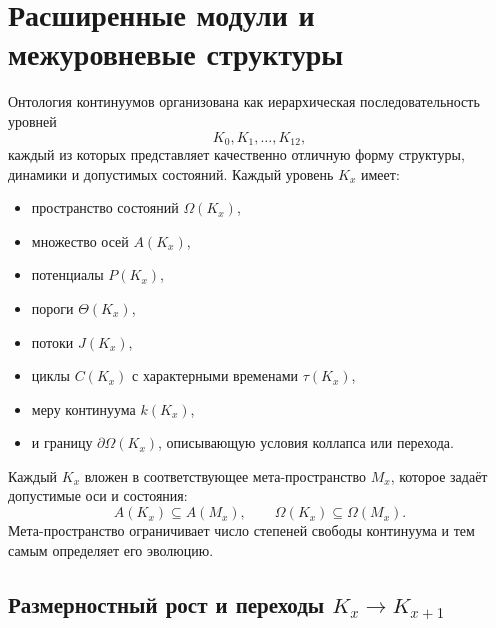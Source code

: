 
\section{Расширенные модули и межуровневые структуры}
\label{sec:klevels-master}

Онтология континуумов организована как иерархическая последовательность
уровней
\[
K_0, K_1, \dots, K_{12},
\]
каждый из которых представляет качественно отличную форму структуры,
динамики и допустимых состояний.
Каждый уровень $K_x$ имеет:
\begin{itemize}
    \item пространство состояний $\Omega(K_x)$,
    \item множество осей $A(K_x)$,
    \item потенциалы $P(K_x)$,
    \item пороги $\Theta(K_x)$,
    \item потоки $J(K_x)$,
    \item циклы $C(K_x)$ с характерными временами $\tau(K_x)$,
    \item меру континуума $k(K_x)$,
    \item и границу $\partial\Omega(K_x)$, описывающую условия
          коллапса или перехода.
\end{itemize}

Каждый $K_x$ вложен в соответствующее мета-пространство $M_x$, которое
задаёт допустимые оси и состояния:
\[
A(K_x) \subseteq A(M_x), \qquad
\Omega(K_x) \subseteq \Omega(M_x).
\]
Мета-пространство ограничивает число степеней свободы континуума и
тем самым определяет его эволюцию.


\subsection{Размерностный рост и переходы $K_x \to K_{x+1}$}

